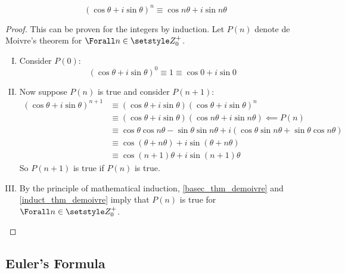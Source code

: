 \begin{theorem}
 \begin{equation*}
  (\cos \theta + i \sin \theta)^n \equiv \cos n\theta + i \sin n\theta
 \end{equation*}
\end{theorem}
\begin{proof}
 This can be proven for the integers by induction. Let \(P(n)\) denote de
 Moivre's theorem for \(\Forall n \in \Integers_0^+\).
 \begin{enumerate}[I.]
  \item \label{basec_thm_demoivre} Consider \(P(0)\):
        \begin{equation*}
         (\cos \theta + i \sin \theta)^0 \equiv 1 \equiv \cos 0 + i \sin 0
        \end{equation*}
  \item \label{induct_thm_demoivre}Now suppose \(P(n)\) is true and consider
        \(P(n + 1)\):
        \begin{align*}
         (\cos \theta + i \sin \theta)^{n + 1} &\equiv
          (\cos \theta + i \sin \theta)(\cos \theta + i \sin \theta)^n \\
          &\equiv (\cos \theta + i \sin \theta)
                  (\cos n\theta + i \sin n\theta) \impliedby P(n) \\
          &\equiv \cos \theta \cos n\theta - \sin \theta \sin n\theta
                + i(\cos \theta \sin n\theta + \sin \theta \cos n\theta) \\
          &\equiv \cos(\theta + n\theta) + i \sin(\theta + n\theta) \\
          &\equiv \cos (n + 1)\theta + i \sin (n + 1)\theta
        \end{align*}
        So \(P(n + 1)\) is true if \(P(n)\) is true.
  \item By the principle of mathematical induction, \ref{basec_thm_demoivre} and
        \ref{induct_thm_demoivre} imply that \(P(n)\) is true for
        \(\Forall n \in \Integers_0^+\).
 \end{enumerate}
\end{proof}

\subsection{Euler's Formula}

